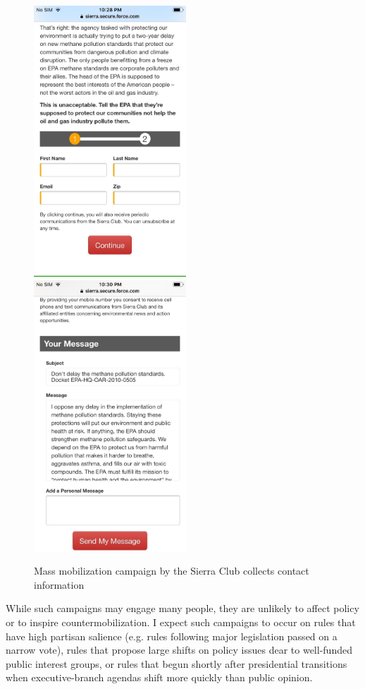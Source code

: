 \begin{subhyp}
\begin{figure}
    \caption{Mass mobilization campaign by the Sierra Club collects contact information}
    \centering
    \includegraphics[height = 4in]{Figs/sierra1.jpeg}
    \includegraphics[height = 4in]{Figs/sierra2.jpeg}
    \label{fig:sierra}
\end{figure}

While such campaigns may engage many people, they are unlikely to affect policy or to inspire countermobilization. I expect such campaigns to occur on rules that have high partisan salience (e.g. rules following major legislation passed on a narrow vote), rules that propose large shifts on policy issues dear to well-funded public interest groups, or rules that begun shortly after presidential transitions when executive-branch agendas shift more quickly than public opinion.


\end{subhyp}
